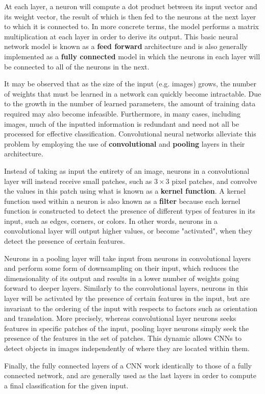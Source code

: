 \documentclass[letterpaper, 12 pt, conference]{ieeeconf}  %
\begin{document}
At each layer, a neuron will compute a dot product between its input vector and its weight vector, the result of which is then fed to the neurons at the next layer to which it is connected to. In more concrete terms, the model performs a matrix multiplication at each layer in order to derive its output. This basic neural network model is known as a \textbf{feed forward} architecture and is also generally implemented as a \textbf{fully connected} model in which the neurons in each layer will be connected to all of the neurons in the next. 
\par
It may be observed that as the size of the input (e.g. images) grows, the number of weights that must be learned in a network can quickly become intractable. Due to the growth in the number of learned parameters, the amount of training data required may also become infeasible. Furthermore, in many cases, including images, much of the inputted information is redundant and need not all be processed for effective classification. Convolutional neural networks alleviate this problem by employing the use of \textbf{convolutional} and \textbf{pooling} layers in their architecture.
\par
Instead of taking as input the entirety of an image, neurons in a convolutional layer will instead receive small patches, such as $3\times 3$ pixel patches, and convolve the values in this patch using  what is known as a \textbf{kernel function}. A kernel function used within a neuron is also known as a \textbf{filter} because each kernel function is constructed to detect the presence of different types of features in its input, such as edges, corners, or colors. In other words, neurons in a convolutional layer will output higher values, or become "activated", when they detect the presence of certain features. 
\par
Neurons in a pooling layer will take input from neurons in convolutional layers and perform some form of downsampling on their input, which reduces the dimensionality of its output and results in a lower number of weights going forward to deeper layers. Similarly to the convolutional layers, neurons in this layer will be activated by the presence of certain features in the input, but are invariant to the ordering of the input with respects to factors such as orientation and translation. More precisely, whereas convolutional layer neurons seeks features in specific patches of the input, pooling layer neurons simply seek the presence of the features in the set of patches. This dynamic allows CNNs to detect objects in images independently of where they are located within them. 
\par
Finally, the fully connected layers of a CNN work identically to those of a fully connected network, and are generally used as the last layers in order to compute a final classification for the given input. 
\par
\end{document}
